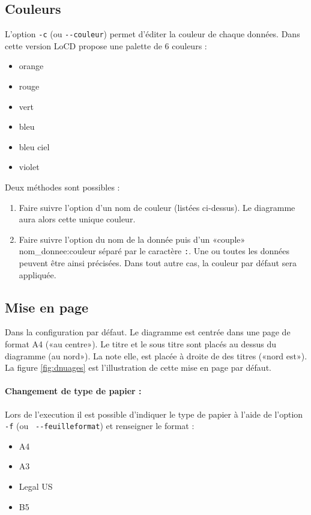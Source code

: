 \subsection{Couleurs}
\label{subsec:couleurs}
L'option \verb+-c+ (ou \verb+--couleur+) permet d'éditer la couleur de chaque données. Dans cette version LoCD propose une palette de 6 couleurs :
\begin{itemize}
\item
  orange
\item
  rouge
\item
  vert
\item
  bleu
\item
  bleu ciel
\item
  violet
\end{itemize}
Deux méthodes sont possibles :
\begin{enumerate}
\item
  Faire suivre l'option d'un nom de couleur (listées ci-dessus). Le diagramme aura alors cette unique couleur.
\item
  Faire suivre l'option du nom de la donnée puis d'un «couple» nom\_donnee:couleur séparé par le caractère \verb+:+. Une ou toutes les données peuvent être ainsi précisées. Dans tout autre cas, la couleur par défaut sera appliquée.
\end{enumerate}   
\subsection{Mise en page}
\label{subsec:misepage}
Dans la configuration par défaut. Le diagramme est centrée dans une page de format A4 («au centre»). Le titre et le sous titre sont placés au dessus du diagramme (au nord»). La note elle, est placée à droite de des titres («nord est»). La figure \ref{fig:dnuages} est l'illustration de cette mise en page par défaut. 
  \paragraph{Changement de type de papier :}
  \label{par:chgtpap}
  Lors de l'execution il est possible d'indiquer le type de papier à l'aide de l'option \verb+-f+ (ou \verb+ --feuilleformat+) et renseigner le format :
  \begin{itemize}
  \item
    A4
  \item
    A3
  \item
    Legal US
  \item
    B5
  \end{itemize} 
